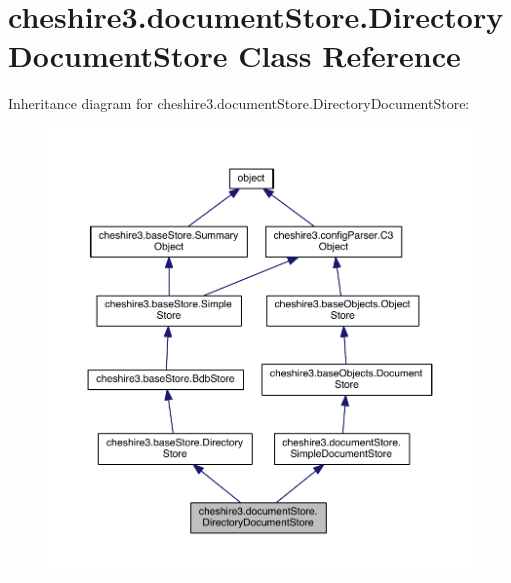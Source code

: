 \hypertarget{classcheshire3_1_1document_store_1_1_directory_document_store}{\section{cheshire3.\-document\-Store.\-Directory\-Document\-Store Class Reference}
\label{classcheshire3_1_1document_store_1_1_directory_document_store}
}


Inheritance diagram for cheshire3.\-document\-Store.\-Directory\-Document\-Store\-:
\nopagebreak
\begin{figure}[H]
\begin{center}
\leavevmode
\includegraphics[width=350pt]{classcheshire3_1_1document_store_1_1_directory_document_store__inherit__graph}
\end{center}
\end{figure}


